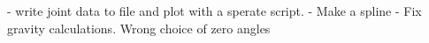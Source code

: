 - write joint data to file and plot with a sperate script. 
- Make a spline 
- Fix gravity calculations. Wrong choice of zero angles